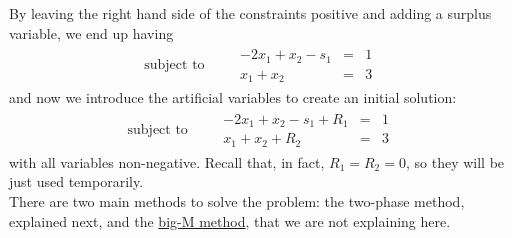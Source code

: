 \documentclass[c]{beamer}
\begin{document}
\begin{frame}
  By leaving the right hand side of the constraints positive and adding a surplus variable, we end up having
  \begin{equation*}
    \begin{aligned}
       \text{subject to }\quad &
      \begin{array}{rcl}
        -2x_1 +x_2 -s_1 &= &1 \\
        x_1+x_2 &= &3
      \end{array}
    \end{aligned}
  \end{equation*}
  and now we introduce the artificial variables to create an initial solution:
  \begin{equation*}
    \begin{aligned}
       \text{subject to }\quad &
      \begin{array}{rcl}
        -2x_1 +x_2 -s_1 +R_1&= &1 \\
        x_1+x_2 +R_2&= &3
      \end{array}
    \end{aligned}
  \end{equation*}
  with all variables non-negative. Recall that, in fact, $R_1=R_2=0$, so they will be just used temporarily.
  \\[10pt]

  There are two main methods to solve the problem: the two-phase method, explained next, and the \href{https://www.youtube.com/watch?v=btjxqq-vMOg}{big-M method}, that we are not explaining here.
\end{frame}
\end{document}
